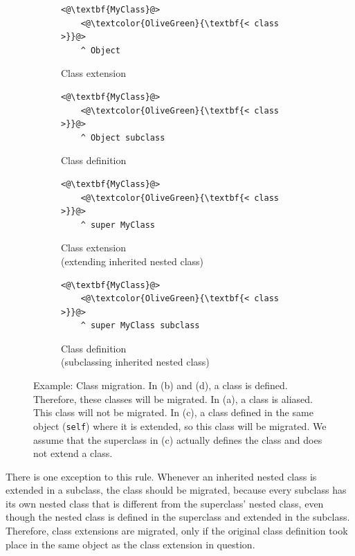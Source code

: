 \begin{figure}[!htp]
\centering
\begin{subfigure}[b]{0.45\textwidth}
\begin{lstlisting}
<@\textbf{MyClass}@>
    <@\textcolor{OliveGreen}{\textbf{< class >}}@>
    ^ Object
\end{lstlisting}
\caption{Class extension}
\label{fig:impl_cls_migr_ext}
\end{subfigure}
\qquad
\begin{subfigure}[b]{0.45\textwidth}
\begin{lstlisting}
<@\textbf{MyClass}@>
    <@\textcolor{OliveGreen}{\textbf{< class >}}@>
    ^ Object subclass
\end{lstlisting}
\caption{Class definition}
\label{fig:impl_cls_migr_def}
\end{subfigure}

\vspace{10pt}

\begin{subfigure}[b]{0.45\textwidth}
\begin{lstlisting}
<@\textbf{MyClass}@>
    <@\textcolor{OliveGreen}{\textbf{< class >}}@>
    ^ super MyClass
\end{lstlisting}
\caption{Class extension \\ (extending inherited nested class)}
\label{fig:impl_cls_migr_ext_nested}
\end{subfigure}
\qquad
\begin{subfigure}[b]{0.45\textwidth}
\begin{lstlisting}
<@\textbf{MyClass}@>
    <@\textcolor{OliveGreen}{\textbf{< class >}}@>
    ^ super MyClass subclass
\end{lstlisting}
\caption{Class definition \\ (subclassing inherited nested class)}
\label{fig:impl_cls_migr_subclass_nested}
\end{subfigure}
\caption[Example: Class migration]{Example: Class migration. In (b) and (d), a class is defined. Therefore, these classes will be migrated. In (a), a class is aliased. This class will not be migrated. In (c), a class defined in the same object (\texttt{self}) where it is extended, so this class will be migrated. We assume that the superclass in (c) actually defines the class and does not extend a class.}
\label{fig:impl_cls_migration_full}
\end{figure}

There is one exception to this rule. Whenever an inherited nested class is extended in a subclass, the class should be migrated, because every subclass has its own nested class that is different from the superclass' nested class, even though the nested class is defined in the superclass and extended in the subclass. Therefore, class extensions are migrated, only if the original class definition took place in the same object as the class extension in question.

